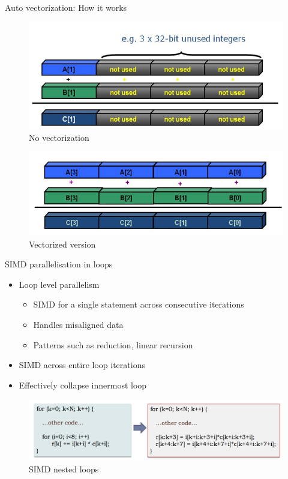 \documentclass[10pt,times]{beamer}
\begin{document}
\begin{frame}{Auto vectorization: How it works}
\begin{figure}
\includegraphics[width=.7\linewidth]{figs/novectorization.png}
\caption*{No vectorization}
\end{figure}
\begin{figure}
\includegraphics[width=.7\linewidth]{figs/vectorized.png}
\caption*{Vectorized version}
\end{figure}

\end{frame}

\begin{frame}{SIMD parallelisation in loops}
\begin{itemize}
\item Loop level parallelism
\begin{itemize}
\item SIMD for a single statement across consecutive iterations
\item Handles misaligned data
\item Patterns such as reduction, linear recursion
\end{itemize}
\item SIMD across entire loop iterations
\item Effectively collapse innermost loop
\end{itemize}
\begin{figure}
\includegraphics[width=\linewidth]{figs/simd_loop.png}
\caption*{SIMD nested loops}
\end{figure}
\end{frame}
\end{document}

